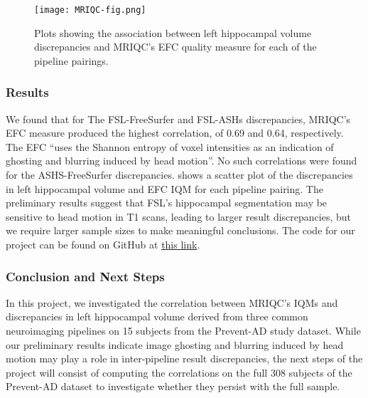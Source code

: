 \documentclass[../main.tex]{subfiles}
\begin{document}
\begin{figure}[!h]
	\centering
	\texttt{[image: MRIQC-fig.png]}
	\caption{Plots showing the association between left hippocampal volume discrepancies and MRIQC’s EFC quality measure for each of the pipeline pairings.}
	\label{fig:MRIQC-fig}
\end{figure}

\subsubsection{Results}

We found that for The FSL-FreeSurfer and FSL-ASHs discrepancies, MRIQC’s EFC measure produced the highest correlation, of 0.69 and 0.64, respectively. The EFC “uses the Shannon entropy of voxel intensities as an indication of ghosting and blurring induced by head motion”\supercite{MRIQCdoc}. No such correlations were found for the ASHS-FreeSurfer discrepancies.  shows a scatter plot of the discrepancies in left hippocampal volume and EFC IQM for each pipeline pairing. The preliminary results suggest that FSL’s hippocampal segmentation may be sensitive to head motion in T1 scans, leading to larger result discrepancies, but we require larger sample sizes to make meaningful conclusions. The code for our project can be found on GitHub at \href{https://github.com/jacobsanz97/Pipeline-Discrepancy-Exploration}{this link}. 

\subsubsection{Conclusion and Next Steps}

In this project, we investigated the correlation between MRIQC’s IQMs and discrepancies in left hippocampal volume derived from three common neuroimaging pipelines on 15 subjects from the Prevent-AD study dataset. While our preliminary results indicate image ghosting and blurring induced by head motion may play a role in inter-pipeline result discrepancies, the next steps of the project will consist of computing the correlations on the full 308 subjects of the Prevent-AD dataset to investigate whether they persist with the full sample.
\end{document}
